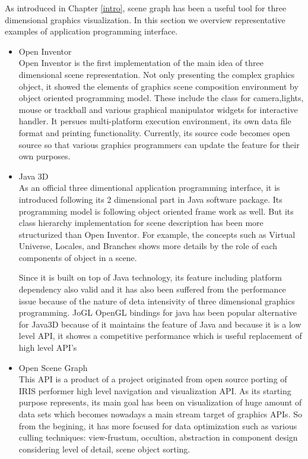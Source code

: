 \documentclass[preprint,nocopyrightspace]{sigplanconf}
\begin{document}
As introduced in Chapter \ref{intro}, scene graph has been a useful tool for three dimensional graphics visualization. In this section we overview representative examples of application programming interface.
\begin{itemize}
\item Open Inventor \cite{OpenInventor}\\
Open Inventor is the first implementation of the main idea of three dimensional scene representation. Not only presenting the complex graphics object, it showed the elements of graphics scene composition environment by object oriented programming model. These include the class for camera,lights, mouse or trackball and various graphical manipulator widgets for interactive handler. It persues multi-platform execution environment, its own data file format and printing functionality. Currently, its source code becomes open source so that various graphics programmers can update the feature for their own purposes.
\item Java 3D \cite{Java3D}\\
As an official three dimentional application programming interface, it is introduced following its 2 dimensional part in Java software package. Its programming model is following object oriented frame work as well. But its class hierarchy implementation for scene description has been more structurized than Open Inventor. For example, the concepts such as Virtual Universe, Locales, and Branches shows more details by the role of each components of object in a scene. 

Since it is built on top of Java technology, its feature including platform dependency also valid and it has also been suffered from the performance issue because of the nature of deta intensivity of three dimensional graphics programming. JoGL\cite{jogl} OpenGL bindings for java has been popular alternative for Java3D because of it maintains the feature of Java and because it is a low level API, it showes a competitive performance which is useful replacement of high level API's 
\item Open Scene Graph \cite{OpenSceneGraph}\\
This API is a product of a project originated from open source porting of IRIS performer high level navigation and visualization API. As its starting purpose represents, its main goal has been on visualization of huge amount of data sets which becomes nowadays a main stream target of graphics APIs. So from the begining, it has more focused for data optimization such as various culling techniques: view-frustum, occultion, abstraction in component design considering level of detail, scene object sorting. 


\end{itemize}
\end{document}
